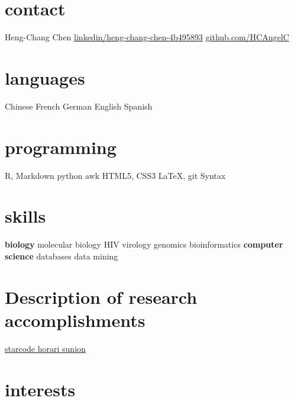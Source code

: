 \documentclass[]{friggeri-cv} %
\begin{document}



\begin{aside} %
  \section{contact}
  {\FA \faUser}
  Heng-Chang Chen
  {\FA \faLinkedinSign}
  \href{http://www.linkedin.com/in/heng-chang-chen-4b495893}{linkedin/heng-chang-chen-4b495893}
  {\FA \faGithubSign}
  \href{http://github.com/HCAngelC}{github.com/HCAngelC}
  \section{languages}
  Chinese
  French
  German
  English
  Spanish
  \section{programming}
  R, Markdown
  python
  awk
  HTML5, CSS3
  \LaTeX, git Syntax
  \section{skills}
  {\bf biology}
  molecular biology
  HIV virology
  genomics
  bioinformatics
  {\bf computer science}
  databases
  data mining 
  \section{Description of research accomplishments}
  \href{http://github.com/gui11aume/starcode}{starcode {\FA \faExternalLink}}
  \href{http://horari.sunion.cat}{horari sunion {\FA \faExternalLink}}
\end{aside}


\section{interests}
\end{document}
